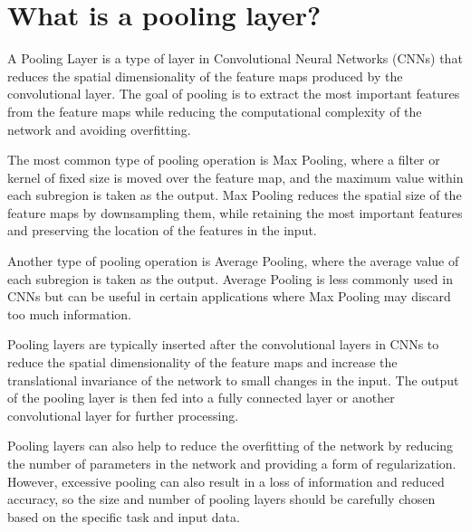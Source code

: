 \section{What is a pooling layer?}
A Pooling Layer is a type of layer in Convolutional Neural Networks (CNNs) that reduces the spatial dimensionality of the feature maps produced by the convolutional layer. The goal of pooling is to extract the most important features from the feature maps while reducing the computational complexity of the network and avoiding overfitting.

The most common type of pooling operation is Max Pooling, where a filter or kernel of fixed size is moved over the feature map, and the maximum value within each subregion is taken as the output. Max Pooling reduces the spatial size of the feature maps by downsampling them, while retaining the most important features and preserving the location of the features in the input.

Another type of pooling operation is Average Pooling, where the average value of each subregion is taken as the output. Average Pooling is less commonly used in CNNs but can be useful in certain applications where Max Pooling may discard too much information.

Pooling layers are typically inserted after the convolutional layers in CNNs to reduce the spatial dimensionality of the feature maps and increase the translational invariance of the network to small changes in the input. The output of the pooling layer is then fed into a fully connected layer or another convolutional layer for further processing.

Pooling layers can also help to reduce the overfitting of the network by reducing the number of parameters in the network and providing a form of regularization. However, excessive pooling can also result in a loss of information and reduced accuracy, so the size and number of pooling layers should be carefully chosen based on the specific task and input data.

